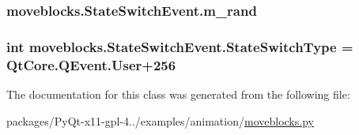 \subsubsection[{m\+\_\+rand}]{\setlength{\rightskip}{0pt plus 5cm}moveblocks.\+State\+Switch\+Event.\+m\+\_\+rand}\label{classmoveblocks_1_1StateSwitchEvent_aa47383df4bf16f366d8fe44e088429ef}
\hypertarget{classmoveblocks_1_1StateSwitchEvent_ad8b0247a5387fa6f436121f5f76880d7}{}
\subsubsection[{State\+Switch\+Type}]{\setlength{\rightskip}{0pt plus 5cm}int moveblocks.\+State\+Switch\+Event.\+State\+Switch\+Type = Qt\+Core.\+Q\+Event.\+User+256\hspace{0.3cm}{\ttfamily [static]}}\label{classmoveblocks_1_1StateSwitchEvent_ad8b0247a5387fa6f436121f5f76880d7}


The documentation for this class was generated from the following file\+:\begin{DoxyCompactItemize}
\item 
packages/\+Py\+Qt-\/x11-\/gpl-\/4../examples/animation/\hyperlink{moveblocks_8py}{moveblocks.\+py}\end{DoxyCompactItemize}
